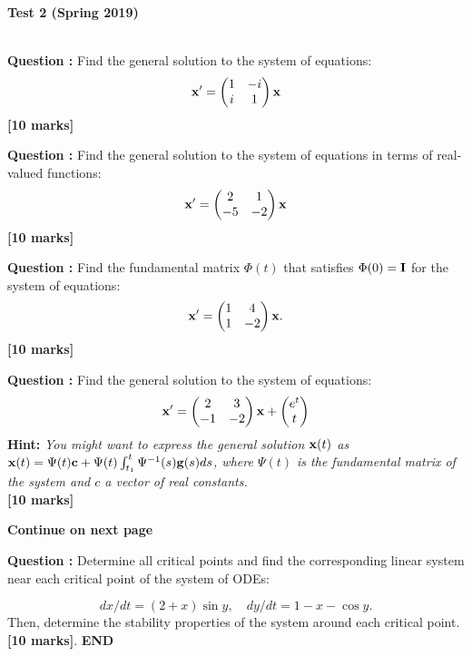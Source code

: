 \documentclass[11pt,a4paper]{article}
\newcounter{mk}
\newcommand{\mrk}[1]{\hfill\textbf{[#1 marks]}}
\newcommand{\qtion}{\stepcounter{mk}\textbf{Question \arabic{mk}: }}
\begin{document}
	\begin{center}
		\textbf{\large Test 2 (Spring 2019)}
	\end{center}
	\\[1cm]
		\qtion Find the general solution to the system of equations:
		$$
		\vb{x}^\prime
		=
		\begin{pmatrix}
			1 & -i\\
			i & 1
		\end{pmatrix}\vb{x}
		$$
		\mrk{10}\par
		\qtion Find the general solution to the system of equations in terms of real-valued functions:
		$$
		\vb{x}^\prime
		=
		\begin{pmatrix}
			2 & 1\\
			-5 & -2
		\end{pmatrix}\vb{x}
		$$
		\mrk{10}\par
		\qtion Find the fundamental matrix $\Phi(t)$ that satisfies $\Phi(0) = \vb{I}$ for the system of equations:
		$$
		\vb{x}^\prime =
		\begin{pmatrix}
			1 & 4\\
			1 & -2
		\end{pmatrix}\vb{x}.
		$$
		\mrk{10}\par
		\qtion Find the general solution to the system of equations:
		$$
		\vb{x}^\prime =
		\begin{pmatrix}
			2 & 3\\
			-1 & -2
		\end{pmatrix}\vb{x} +
		\begin{pmatrix}
			e^t\\
			t
		\end{pmatrix}
		$$
		\textbf{Hint:} \textit{You might want to express the general solution $\vb{x}(t)$ as $\vb{x}(t) = \Psi(t)\vb{c}+ \Psi(t)\int^t_{t_1}\Psi^{-1}(s)\vb{g}(s)\allowbreak ds$, where $\Psi(t)$ is the fundamental matrix of the system and $c$ a vector of real constants.}\\
		\vspace*{0ex}\mrk{10}\par
		\hfill\textbf{Continue on next page}\par
		\pagebreak
		\qtion Determine all critical points and find the corresponding linear system near each critical point of the system of ODEs:\par
		$$
		dx/dt = (2 + x) \sin y,\quad dy/dt = 1 - x - \cos y.
		$$
		Then, determine the stability properties of the system around each critical point.\\
		\vspace*{0ex}\mrk{10}.
		\vfill\centering\textbf{END}
\end{document}

